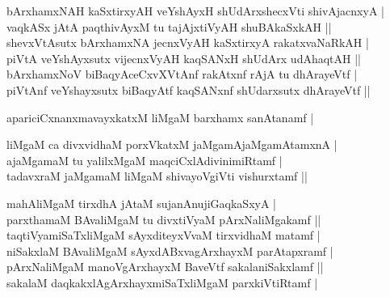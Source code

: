 \begin{entry}
\smallskip
\begin{shl}
bArxhamxNAH kaSxtirxyAH veYshAyxH shUdArxshecxVti shivAjacnxyA |\\
vaqkASx jAtA paqthivAyxM tu tajAjxtiVyAH shuBAkaSxkAH ||\\
shevxVtAsutx bArxhamxNA jecnxVyAH kaSxtirxyA rakatxvaNaRkAH |\\
piVtA veYshAyxsutx vijecnxVyAH kaqSANxH shUdArx udAhaqtAH ||\\
bArxhamxNoV biBaqyAceCxvXVtAnf rakAtxnf rAjA tu dhArayeVtf |\\
piVtAnf veYshayxsutx biBaqyAtf kaqSANxnf shUdarxsutx dhArayeVtf ||
\end{shl}
\medskip
{}
\smallskip
\begin{shl}
apariciCxnanxmavayxkatxM liMgaM barxhamx sanAtanamf |
\end{shl}
\medskip
{}
\smallskip
\begin{shl}
liMgaM ca divxvidhaM porxVkatxM jaMgamAjaMgamAtamxnA |\\
ajaMgamaM tu yalilxMgaM maqciCxlAdivinimiRtamf |\\
tadavxraM jaMgamaM liMgaM shivayoVgiVti vishurxtamf ||
\end{shl}
\medskip
{}
\smallskip
\begin{shl}
mahAliMgaM tirxdhA jAtaM sujanAnujiGaqkaSxyA |\\
parxthamaM BAvaliMgaM tu divxtiVyaM pArxNaliMgakamf ||\\
taqtiVyamiSaTxliMgaM sAyxditeyxVvaM tirxvidhaM matamf |\\
niSakxlaM BAvaliMgaM sAyxdABxvagArxhayxM parAtapxramf |\\
pArxNaliMgaM manoVgArxhayxM BaveVtf sakalaniSakxlamf ||\\
sakalaM daqkakxlAgArxhayxmiSaTxliMgaM parxkiVtiRtamf |
\end{shl}

\end{entry}
